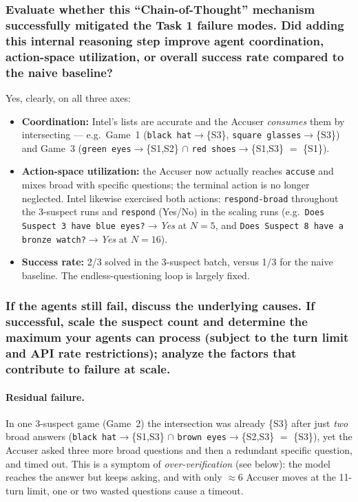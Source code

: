 \documentclass{article}
\begin{document}
\subsubsection*{Evaluate whether this ``Chain-of-Thought'' mechanism successfully mitigated the
Task 1 failure modes. Did adding this internal reasoning step improve agent coordination,
action-space utilization, or overall success rate compared to the naive baseline?}

Yes, clearly, on all three axes:
\begin{itemize}[leftmargin=1.4em,itemsep=2pt]
  \item \textbf{Coordination:} Intel's lists are accurate and the Accuser \emph{consumes}
  them by intersecting --- e.g.\ Game~1 (\texttt{black hat}$\to$\{S3\},
  \texttt{square glasses}$\to$\{S3\}) and Game~3
  (\texttt{green eyes}$\to$\{S1,S2\} $\cap$ \texttt{red shoes}$\to$\{S1,S3\} $=$ \{S1\}).
  \item \textbf{Action-space utilization:} the Accuser now actually reaches
  \texttt{accuse} and mixes broad with specific questions; the terminal action is no
  longer neglected. Intel likewise exercised both actions: \texttt{respond-broad} throughout
  the 3-suspect runs and \texttt{respond} (Yes/No) in the scaling runs (e.g.\
  \texttt{Does Suspect 3 have blue eyes?}$\to$\emph{Yes} at $N{=}5$, and
  \texttt{Does Suspect 8 have a bronze watch?}$\to$\emph{Yes} at $N{=}16$).
  \item \textbf{Success rate:} 2/3 solved in the 3-suspect batch, versus 1/3 for the naive
  baseline. The endless-questioning loop is largely fixed.
\end{itemize}

\subsubsection*{If the agents still fail, discuss the underlying causes. If successful, scale
the suspect count and determine the maximum your agents can process (subject to the turn
limit and API rate restrictions); analyze the factors that contribute to failure at scale.}

\paragraph{Residual failure.} In one 3-suspect game (Game~2) the intersection was already
\{S3\} after just \emph{two} broad answers
(\texttt{black hat}$\to$\{S1,S3\} $\cap$ \texttt{brown eyes}$\to$\{S2,S3\} $=$ \{S3\}), yet
the Accuser asked three more broad questions and then a redundant specific question, and
timed out. This is a symptom of \emph{over-verification} (see below): the model reaches the
answer but keeps asking, and with only $\approx$6 Accuser moves at the 11-turn limit, one or
two wasted questions cause a timeout.
\end{document}
